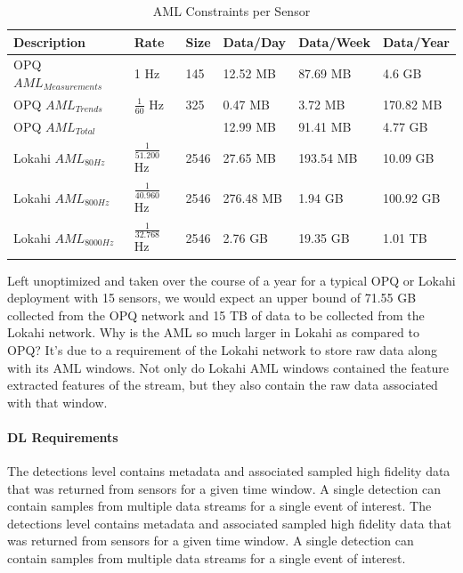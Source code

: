 \begin{table}[H]
	\centering
	\caption{AML Constraints per Sensor}
	\begin{tabularx}{\textwidth}{Xlllll}
		\toprule
		\textbf{Description} & \textbf{Rate} & \textbf{Size} & \textbf{Data/Day} & \textbf{Data/Week} & \textbf{Data/Year} \\
		\midrule
		OPQ $AML_{Measurements}$ 	& 1 Hz 					& 145 			& 12.52 MB 	& 87.69 MB 	& 4.6 GB 	\\
		OPQ $AML_{Trends}$ 			& $\frac{1}{60}$ Hz 	& 325 			& 0.47 MB 	& 3.72 MB  	& 170.82 MB \\
		OPQ $AML_{Total}$ 			&   					&   			& 12.99 MB 	& 91.41 MB 	& 4.77 GB 	\\
		Lokahi $AML_{80Hz}$			& $\frac{1}{51.200}$ Hz	& 2546  		& 27.65 MB 	& 193.54 MB & 10.09 GB	\\
		Lokahi $AML_{800Hz}$		& $\frac{1}{40.960}$ Hz	& 2546		& 276.48 MB & 1.94 GB 	& 100.92 GB \\
		Lokahi $AML_{8000Hz}$		& $\frac{1}{32.768}$ Hz	& 2546		& 2.76 GB 	& 19.35 GB 	& 1.01 TB 	\\
		\bottomrule
	\end{tabularx}
	\label{table:aml_size}
\end{table}

Left unoptimized and taken over the course of a year for a typical OPQ or Lokahi deployment with 15 sensors, we would expect an upper bound of 71.55 GB collected from the OPQ network and 15 TB of data to be collected from the Lokahi network. Why is the AML so much larger in Lokahi as compared to OPQ? It's due to a requirement of the Lokahi network to store raw data along with its AML windows. Not only do Lokahi AML windows contained the feature extracted features of the stream, but they also contain the raw data associated with that window.

\paragraph{DL Requirements}
The detections level contains metadata and associated sampled high fidelity data that was returned from sensors for a given time window. A single detection can contain samples from multiple data streams for a single event of interest.
The detections level contains metadata and associated sampled high fidelity data that was returned from sensors for a given time window. A single detection can contain samples from multiple data streams for a single event of interest.

